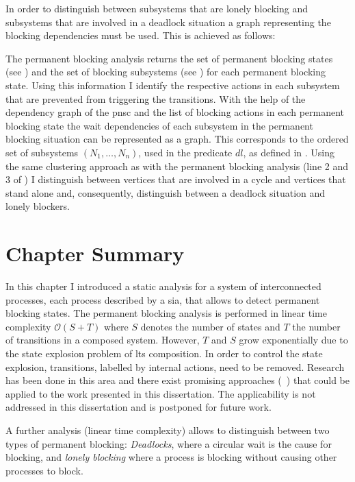 In order to distinguish between subsystems that are lonely blocking and subsystems that are involved in a deadlock situation a graph representing the blocking dependencies must be used.
This is achieved as follows:

The permanent blocking analysis returns the set of permanent blocking states (see \Equ{\ref{eq_sia_blockn}}) and the set of blocking subsystems (see \Equ{\ref{eq_sia_sysn}}) for each permanent blocking state.
Using this information I identify the respective actions in each subsystem that are prevented from triggering the transitions.
With the help of the dependency graph of the \gls{pnsc} and the list of blocking actions in each permanent blocking state the wait dependencies of each subsystem in the permanent blocking situation can be represented as a graph.
This corresponds to the ordered set of subsystems $(N_1, \dots, N_n)$, used in the predicate $\mathit{dl}$, as defined in \Equ{\ref{eq_circular2}}.
Using the same clustering approach as with the permanent blocking analysis (line 2 and 3 of \Alg{\ref{alg_blocking}}) I distinguish between vertices that are involved in a cycle and vertices that stand alone and, consequently, distinguish between a deadlock situation and lonely blockers.


\section{Chapter Summary}
\label{sect_block_summary}
In this chapter I introduced a static analysis for a system of interconnected processes, each process described by a \gls{sia}, that allows to detect permanent blocking states.
The permanent blocking analysis is performed in linear time complexity $\mathcal{O}(S+T)$ where $S$ denotes the number of states and $T$ the number of transitions in a composed system.
However, $T$ and $S$ grow exponentially due to the state explosion problem of \gls{lts} composition.
In order to control the state explosion, transitions, labelled by internal actions, need to be removed.
Research has been done in this area and there exist promising approaches (\eg~\cite{pace2003}) that could be applied to the work presented in this dissertation.
The applicability is not addressed in this dissertation and is postponed for future work.

A further analysis (linear time complexity) allows to distinguish between two types of permanent blocking:
\emph{Deadlocks}, where a circular wait is the cause for blocking, and \emph{lonely blocking} where a process is blocking without causing other processes to block.

